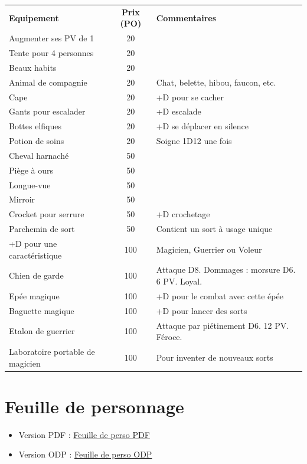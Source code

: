 \documentclass[a4paper, 11pt, twoside]{article}
\begin{document}
\begin{longtable}{lcp{10cm}}
\textbf{Equipement} & \textbf{Prix (PO)} & \textbf{Commentaires}\\
Augmenter ses PV de 1 & 20 & \\
Tente pour 4 personnes & 20 & \\
Beaux habits & 20 & \\
Animal de compagnie & 20 & Chat, belette, hibou, faucon, etc.\\
Cape & 20 & +D pour se cacher\\
Gants pour escalader & 20 & +D escalade\\
Bottes elfiques & 20 & +D se déplacer en silence\\
Potion de soins & 20 & Soigne 1D12 une fois\\
Cheval harnaché & 50 & \\
Piège à ours & 50 & \\
Longue-vue & 50 & \\
Mirroir & 50 & \\
Crocket pour serrure & 50 & +D crochetage\\
Parchemin de sort & 50 & Contient un sort à usage unique\\
+D pour une caractéristique & 100 & Magicien, Guerrier ou Voleur\\
Chien de garde & 100 & Attaque D8. Dommages : morsure D6. 6 PV. Loyal.\\
Epée magique & 100 & +D pour le combat avec cette épée\\
Baguette magique & 100 & +D pour lancer des sorts\\
Etalon de guerrier & 100 & Attaque par piétinement D6. 12 PV. Féroce.\\
Laboratoire portable de magicien & 100 & Pour inventer de nouveaux sorts\\
\end{longtable}

\section{Feuille de personnage}
\label{sec:org0513444}

\begin{itemize}
\item Version PDF : \href{https://github.com/orey/jdr/blob/master/DungeonSquad-fr/DungeonSquadFr-FeuillePerso.pdf}{Feuille de perso PDF}
\item Version ODP : \href{https://github.com/orey/jdr/blob/master/DungeonSquad-fr/DungeonSquadFr-FeuillePerso.odp}{Feuille de perso ODP}
\end{itemize}
\end{document}
